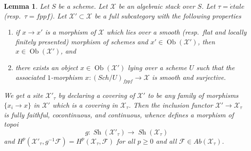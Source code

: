 \documentclass{stacks-project}
\theoremstyle{plain}
\newtheorem{lemma}[subsection]{Lemma}
\theoremstyle{definition}
\theoremstyle{remark}
\numberwithin{equation}{subsection}
\def\Sch{\mathit{Sch}}
\def\Ob{\mathop{\mathrm{Ob}}\nolimits}
\def\Sh{\mathop{\mathit{Sh}}\nolimits}
\def\etale{{\acute{e}tale}}
\begin{document}
\begin{lemma}
\label{lemma-cohomology-on-subcategory}
Let $S$ be a scheme. Let $\mathcal{X}$ be an algebraic stack over $S$.
Let $\tau = \etale$ (resp.\ $\tau = fppf$). Let
$\mathcal{X}' \subset \mathcal{X}$ be a full subcategory with the
following properties
\begin{enumerate}
\item if $x \to x'$ is a morphism of $\mathcal{X}$ which lies over a
smooth (resp.\ flat and locally finitely presented) morphism of
schemes and $x' \in \Ob(\mathcal{X}')$, then $x \in \Ob(\mathcal{X}')$, and
\item there exists an object $x \in \Ob(\mathcal{X}')$ lying over
a scheme $U$ such that the associated $1$-morphism
$x : (\Sch/U)_{fppf} \to \mathcal{X}$ is smooth and surjective.
\end{enumerate}
We get a site $\mathcal{X}'_\tau$ by declaring a covering of $\mathcal{X}'$
to be any family of morphisms $\{x_i \to x\}$ in $\mathcal{X}'$ which is a
covering in $\mathcal{X}_\tau$. Then the inclusion functor
$\mathcal{X}' \to \mathcal{X}_\tau$ is fully faithful, cocontinuous, and
continuous, whence defines a morphism of topoi
$$
g : \Sh(\mathcal{X}'_\tau) \longrightarrow \Sh(\mathcal{X}_\tau)
$$
and $H^p(\mathcal{X}'_\tau, g^{-1}\mathcal{F}) =
H^p(\mathcal{X}_\tau, \mathcal{F})$ for all $p \geq 0$ and all
$\mathcal{F} \in \textit{Ab}(\mathcal{X}_\tau)$.
\end{lemma}
\end{document}
